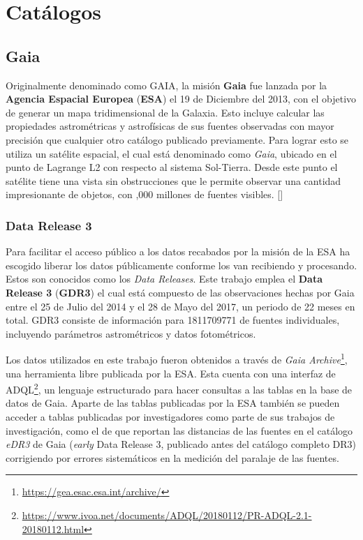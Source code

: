 \chapter{Catálogos}

\section{Gaia} \label{muestra:sec:gaia}

Originalmente denominado como GAIA, la misión \textbf{Gaia} fue lanzada por
la \textbf{Agencia Espacial Europea} (\textbf{ESA}) el 19 de Diciembre del 2013, con el
objetivo de generar un mapa tridimensional de la Galaxia.
Esto incluye calcular las propiedades astrométricas y astrofísicas de sus
fuentes observadas con mayor precisión que cualquier otro catálogo publicado
previamente. Para lograr esto se utiliza un satélite espacial, el cual está
denominado como \textit{Gaia}, ubicado en el punto de Lagrange L2 con respecto al
sistema Sol-Tierra. Desde este punto el satélite tiene una vista sin obstrucciones
que le permite observar una cantidad impresionante de objetos, con ,000 millones de fuentes visibles. [] 

\subsection{Data Release 3}

Para facilitar el acceso público a los datos recabados por la misión de \gaia la
ESA ha escogido liberar los datos públicamente conforme los van recibiendo y
procesando. Estos son conocidos como los \textit{Data Releases}. Este trabajo
emplea el \textbf{Data Release 3} (\textbf{GDR3}) el cual está compuesto de las
observaciones hechas por Gaia entre el 25 de Julio del 2014 y el 28 de Mayo del
2017, un periodo de 22 meses en total. GDR3 consiste de información para
\num{1811709771} de fuentes individuales, incluyendo parámetros astrométricos y
datos fotométricos. 

Los datos utilizados en este trabajo fueron obtenidos a través de
\textit{Gaia Archive}\footnote{\url{https://gea.esac.esa.int/archive/}}, una
herramienta libre publicada por la ESA. Esta cuenta con una interfaz de
ADQL\footnote{\url{https://www.ivoa.net/documents/ADQL/20180112/PR-ADQL-2.1-20180112.html}},
un lenguaje estructurado para hacer consultas a las tablas en la base de datos
de Gaia. Aparte de las tablas publicadas por la ESA también se pueden acceder a
tablas publicadas por investigadores como parte de sus trabajos de
investigación, como el de
 que reportan
las distancias de las fuentes en el catálogo \textit{eDR3} de Gaia
(\textit{early} Data Release 3, publicado antes del catálogo completo DR3)
corrigiendo por errores sistemáticos en la medición del paralaje de las fuentes.

